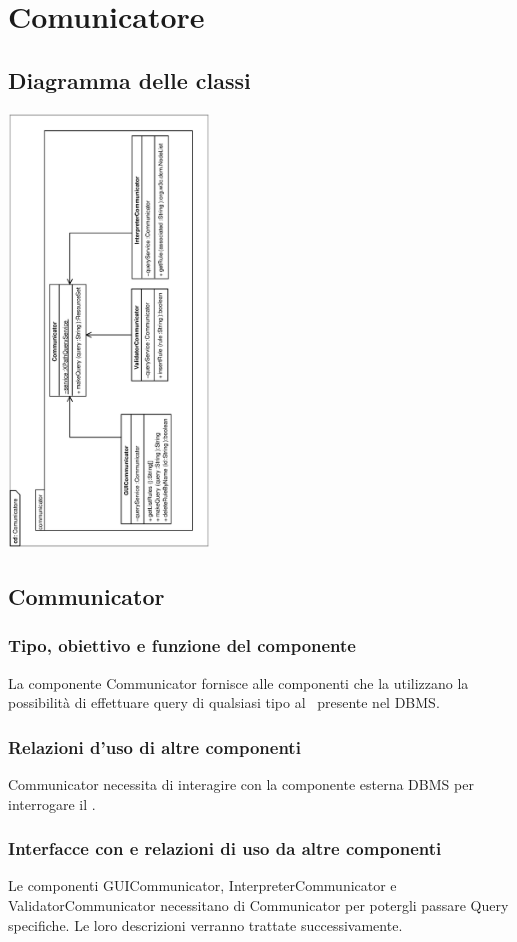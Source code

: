 \documentclass[11pt,titlepage,a4paper]{report}
\begin{document}
\section{Comunicatore}
\subsection{Diagramma delle classi}
\begin{center}
\includegraphics[width=0.4\textwidth, angle=-90]{DiagrammaClassi/Comunicatore.eps}
\end{center}
\subsection{Communicator}
\subsubsection{Tipo, obiettivo e funzione del componente}
La componente Communicator fornisce alle componenti che la utilizzano la possibilit\`a di effettuare query di qualsiasi tipo al \re\ presente nel DBMS.
\subsubsection{Relazioni d'uso di altre componenti}
Communicator necessita di interagire con la componente esterna DBMS per interrogare il \re.
\subsubsection{Interfacce con e relazioni di uso da altre componenti}
Le componenti GUICommunicator, InterpreterCommunicator e ValidatorCommunicator necessitano di Communicator per potergli passare Query specifiche. Le loro descrizioni verranno trattate successivamente.
\end{document}
